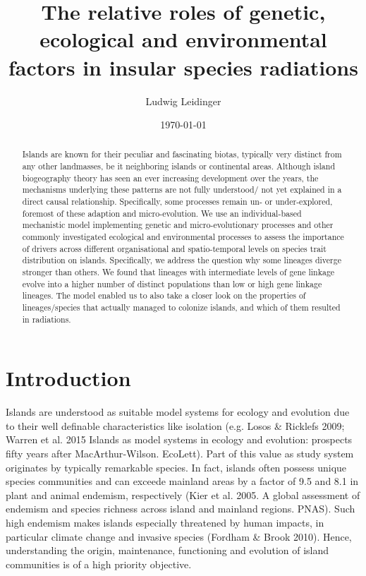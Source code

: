 \documentclass[a4paper]{scrartcl}
\title{The relative roles of genetic, ecological and environmental factors in insular species radiations}
\author{Ludwig Leidinger}
\date{\today}
\begin{document}
\maketitle

\begin{abstract}
  Islands are known for their peculiar and fascinating biotas, typically very distinct from any other landmasses, be it neighboring islands or continental areas.
  Although island biogeography theory has seen an ever increasing development over the years,
  the mechanisms underlying these patterns are not fully understood/ not yet explained in a direct causal relationship.
  Specifically, some processes remain un- or under-explored, foremost of these adaption and micro-evolution.
  We use an individual-based mechanistic model implementing genetic and micro-evolutionary processes and other commonly investigated ecological and
  environmental processes to assess the importance of drivers across different organisational and spatio-temporal levels
  on species trait distribution on islands.
  Specifically, we address the question why some lineages diverge stronger than others.
  We found that lineages with intermediate levels of gene linkage evolve into a higher number of distinct populations
  than low or high gene linkage lineages.
  The model enabled us to also take a closer look on the properties of lineages/species that actually managed to colonize islands,
  and which of them resulted in radiations.
\end{abstract}

\section{Introduction}

Islands are understood as suitable model systems for ecology and evolution due to their well definable characteristics like isolation (e.g. Losos \& Ricklefs 2009; Warren et al. 2015  Islands as model systems in ecology and evolution: prospects fifty years after MacArthur‐Wilson. EcoLett). %
Part of this value as study system originates by typically remarkable species. In fact, islands often possess unique species communities and can exceede mainland areas by a factor of 9.5 and 8.1 in plant and animal  endemism, respectively (Kier et al. 2005. A global assessment of endemism and species richness across island and mainland regions. PNAS). %
Such high endemism makes islands  especially threatened by human impacts, in particular climate change and invasive species (Fordham \& Brook 2010). %
Hence, understanding the origin, maintenance, functioning and evolution of island communities is of a high priority objective.
\end{document}
